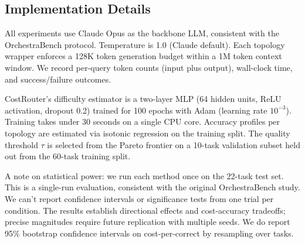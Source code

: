 \subsection{Implementation Details}\label{implementation-details}

All experiments use Claude Opus as the backbone LLM, consistent with the OrchestraBench protocol. Temperature is 1.0 (Claude default). Each topology wrapper enforces a 128K token generation budget within a 1M token context window. We record per-query token counts (input plus output), wall-clock time, and success/failure outcomes.

CostRouter's difficulty estimator is a two-layer MLP (64 hidden units, ReLU activation, dropout 0.2) trained for 100 epochs with Adam (learning rate $10^{-3}$). Training takes under 30 seconds on a single CPU core. Accuracy profiles per topology are estimated via isotonic regression on the training split. The quality threshold $\tau$ is selected from the Pareto frontier on a 10-task validation subset held out from the 60-task training split.

A note on statistical power: we run each method once on the 22-task test set. This is a single-run evaluation, consistent with the original OrchestraBench study. We can't report confidence intervals or significance tests from one trial per condition. The results establish directional effects and cost-accuracy tradeoffs; precise magnitudes require future replication with multiple seeds. We do report 95\% bootstrap confidence intervals on cost-per-correct by resampling over tasks.

